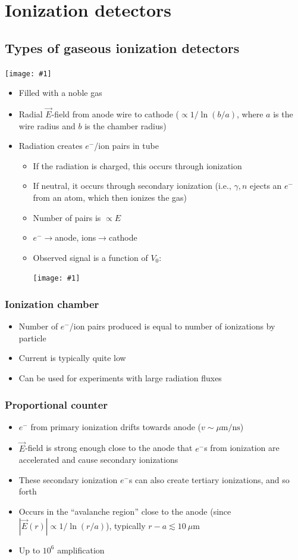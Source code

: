 \documentclass[11pt]{article}
\newcommand{\E}{\ensuremath{\vec{E}}}
\newcommand{\ns}{\text{ns}}
\newcommand{\mum}{\mu\text{m}}
\newcommand{\el}{\ensuremath{e^{-}}\xspace}
\newcommand{\embedimgw}[2]{\begin{center}\texttt{[image: \#1]}\end{center}}
\begin{document}
\section{Ionization detectors}
\subsection{Types of gaseous ionization detectors}
\embedimgw{figs/gasionization.png}{.8}
\begin{itemize}
  \item Filled with a noble gas
  \item Radial $\E$-field from anode wire to cathode ($\propto 1/\ln(b/a)$, where $a$ is the wire radius and $b$ is the chamber radius)
  \item Radiation creates $\el$/ion pairs in tube
  \begin{itemize}
    \item If the radiation is charged, this occurs through ionization
    \item If neutral, it occurs through secondary ionization (i.e., $\gamma,n$ ejects an $\el$ from an atom, which then ionizes the gas)
    \item Number of pairs is $\propto E$
    \item $\el\rightarrow$anode, ions$\rightarrow$cathode
    \item Observed signal is a function of $V_0$:
    \embedimgw{figs/ionization_voltage}{0.8}
  \end{itemize}
\end{itemize}
\subsubsection{Ionization chamber}
\begin{itemize}
  \item Number of $\el$/ion pairs produced is equal to number of ionizations by particle
  \item Current is typically quite low
  \item Can be used for experiments with large radiation fluxes
\end{itemize}
\subsubsection{Proportional counter}
\begin{itemize}
  \item $\el$ from primary ionization drifts towards anode ($v\sim \mum/\ns$)
  \item $\E$-field is strong enough close to the anode that $\el$s from ionization are accelerated and cause secondary ionizations
  \item These secondary ionization $\el$s can also create tertiary ionizations, and so forth
  \item Occurs in the ``avalanche region'' close to the anode (since $|\vec E(r)|\propto 1/\ln(r/a)$), typically $r-a \lesssim 10~\mum$
  \item Up to $10^6$ amplification
\end{itemize}
\end{document}

